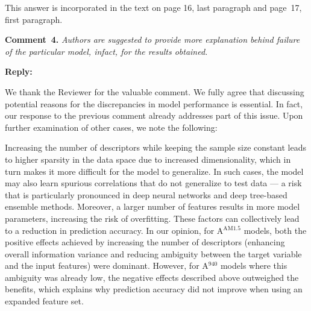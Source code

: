 \documentclass[a4paper,fleqn]{cas-sc}
\begin{document}
This answer is incorporated in the text on page 16, last paragraph and page~17, first paragraph.




\vspace{1cm}
\noindent
\textcolor[rgb]{0.00,0.50,1.00}{\textbf{Comment~4.}}
\emph{Authors are suggested to provide more explanation behind failure of the particular model, infact, for the results obtained.}

\noindent
\textcolor[rgb]{0.51,0.00,0.00}{\textbf{Reply:}}

We thank the Reviewer for the valuable comment.
We fully agree that discussing potential reasons for the discrepancies in model performance is essential.
In fact, our response to the previous comment already addresses part of this issue.
Upon further examination of other cases, we note the following:



Increasing the number of descriptors while keeping the sample size constant leads
to higher sparsity in the data space due to increased dimensionality,
which in turn makes it more difficult for the model to generalize.
In such cases, the model may also learn spurious correlations that do not generalize to test data ---
a risk that is particularly pronounced in deep neural networks and  deep tree-based ensemble methods.
Moreover, a larger number of features results in more model parameters, increasing the risk of overfitting.
These factors can collectively lead to a reduction in prediction accuracy.
In our opinion, for A$^\mathrm{AM1.5}$ models, both the positive effects achieved by increasing the number of descriptors
(enhancing overall information variance and reducing ambiguity between the target variable and the input features) were dominant.
However, for A$^\mathrm{940}$ models where this ambiguity was already low,
the negative effects described above outweighed the benefits,
which explains why prediction accuracy did not improve when using an expanded feature set.
\end{document}
